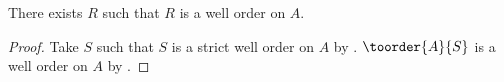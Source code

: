 \begin{theorem}\label{well_order_exists}
    There exists $R$ such that $R$ is a well order on $A$.
\end{theorem}
\begin{proof}
    Take $S$ such that $S$ is a strict well order on $A$
        by .
    $\toorder{A}{S}$ is a well order on $A$
        by .
\end{proof}

